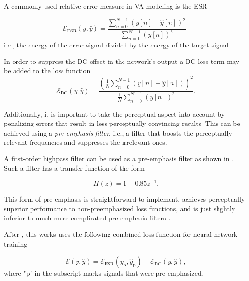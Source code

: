 A commonly used relative error measure in \ac{VA} modeling is the \ac{ESR} \cite{Wright2019,Wright2019a, Wrightetal2020,Wright2020}

\begin{equation}
  \mathcal{E}_\text{ESR}(y, \hat{y}) = \frac{\sum_{n=0}^{N-1} (y[n] - \hat{y}[n])^2}{\sum_{n=0}^{N-1} (y[n])^2},
\end{equation}
i.e., the energy of the error signal divided by the energy of the target signal.

In order to suppress the DC offset in the network's output a DC loss term may be added to the loss function \cite{Wright2019a,Wright2020}
\begin{equation}
  \mathcal{E}_\text{DC}(y, \hat{y}) = \frac{\left(\frac{1}{N} \sum_{n=0}^{N-1} (y[n] - \hat{y}[n])\right)^2}{\frac{1}{N} \sum_{n=0}^{N-1} (y[n])^2}.
\end{equation}

Additionally, it is important to take the perceptual aspect into account by penalizing errors that result in less perceptually convincing results. This can be achieved using a \emph{pre-emphasis filter}, i.e., a filter that boosts the perceptually relevant frequencies and suppresses the irrelevant ones.

A first-order highpass filter can be used as a pre-emphasis filter as shown in \cite{Wright2019,Wrightetal2020,Wright2020}. Such a filter has a transfer function of the form

\begin{equation}
  H(z) = 1 - 0.85 z^{-1}.
\end{equation}

This form of pre-emphasis is straightforward to implement, achieves perceptually superior performance to non-preemphasized loss functions, and is just slightly inferior to much more complicated pre-emphasis filters \cite{Wright2019a}.

After \cite{Wright2019a,Wright2020,Wright2019}, this works uses the following combined loss function for neural network training

\begin{equation}
  \mathcal{E}(y, \hat{y}) = \mathcal{E}_\text{ESR}(y_\text{p}, \hat{y}_\text{p}) + \mathcal{E}_\text{DC}(y, \hat{y}),
  \label{eq:final_loss_function}
\end{equation}
where "p" in the subscript marks signals that were pre-emphasized.

